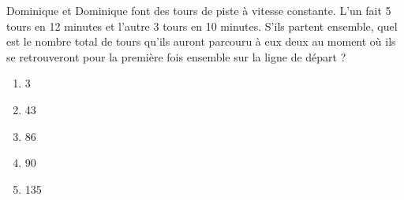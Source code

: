 Dominique et Dominique font des tours de piste à vitesse constante. L'un fait 5 tours en 12 minutes et l'autre 3 tours en 10 minutes. S'ils partent ensemble, quel est le nombre total de tours qu'ils auront parcouru à eux deux au moment où ils se retrouveront pour la première fois ensemble sur la ligne de départ ?
\begin{multicols}{5}
  \begin{enumerate}[A/]
  \item 3
  \item 43
  \item 86
  \item 90
  \item 135
  \end{enumerate}
\end{multicols}